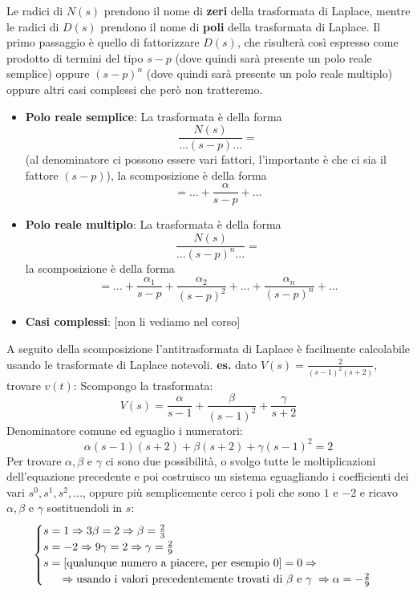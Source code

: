 Le radici di $N(s)$ prendono il nome di \textbf{zeri} della trasformata di Laplace, mentre le radici di $D(s)$ prendono il nome di \textbf{poli} della trasformata di Laplace.\newline
\newline
Il primo passaggio è quello di fattorizzare $D(s)$, che risulterà così espresso come prodotto di termini del tipo $s-p$ (dove quindi sarà presente un polo reale semplice) oppure $(s-p)^n$ (dove quindi sarà presente un polo reale multiplo) oppure altri casi complessi che però non tratteremo.
\begin{itemize}
    \item \textbf{Polo reale semplice}:\newline
    La trasformata è della forma 
    \[
        \frac{N(s)}{\dots(s-p)\dots} =
    \]
    (al denominatore ci possono essere vari fattori, l'importante è che ci sia il fattore $(s-p)$), la scomposizione è della forma
    \[
        = \dots + \frac{\alpha}{s-p} + \dots
    \]
    \item \textbf{Polo reale multiplo}:\newline
    La trasformata è della forma
    \[
        \frac{N(s)}{\dots (s-p)^n \dots} =
    \]
    la scomposizione è della forma
    \[
        = \dots + \frac{\alpha_1}{s-p} + \frac{\alpha_2}{(s-p)^2} + \dots + \frac{\alpha_n}{(s-p)^n} + \dots
    \]
    \item \textbf{Casi complessi}: [non li vediamo nel corso]
\end{itemize}
A seguito della scomposizione l'antitrasformata di Laplace è facilmente calcolabile usando le trasformate di Laplace notevoli.
\newline
\newline
\newline
\textbf{es.} dato $V(s) = \frac{2}{(s-1)^2(s+2)}$, trovare $v(t)$:\newline
Scompongo la trasformata:
\[
    V(s) = \frac{\alpha}{s-1} + \frac{\beta}{(s-1)^2} + \frac{\gamma}{s+2}
\]
Denominatore comune ed eguaglio i numeratori:
\[
    \alpha(s-1)(s+2) + \beta(s+2) + \gamma(s-1)^2 = 2
\]
Per trovare $\alpha, \beta$ e $\gamma$ ci sono due possibilità, o svolgo tutte le moltiplicazioni dell'equazione precedente e poi costruisco un sistema eguagliando i coefficienti dei vari $s^0, s^1, s^2, \dots$, oppure più semplicemente cerco i poli che sono $1$ e $-2$ e ricavo $\alpha, \beta$ e $\gamma$ sostituendoli in $s$:
\[
    \begin{cases}
        s=1 \Rightarrow 3 \beta = 2 \Rightarrow \beta = \frac{2}{3}\\
        s=-2 \Rightarrow 9 \gamma = 2 \Rightarrow \gamma = \frac{2}{9}\\
        s=[\text{qualunque numero a piacere, per esempio 0}] = 0 \Rightarrow \\
        \text{\;\;\;\;\;} \Rightarrow \text{usando i valori precedentemente trovati di $\beta$ e $\gamma$}\; \Rightarrow \alpha=-\frac{2}{9} 
    \end{cases}
\] 

